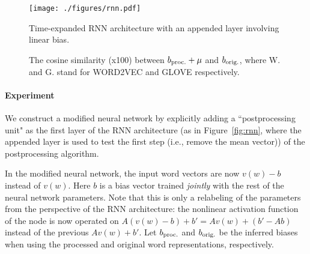 \documentclass{article} \usepackage{acl2017,times}
\begin{document}
{\begin{figure}[htbp]
\begin{minipage}{0.48\textwidth}
\centering
\texttt{[image: ./figures/rnn.pdf]}
\caption{Time-expanded RNN architecture with an appended layer involving linear bias. \label{fig:rnn}}
\end{minipage}
\begin{minipage}{0.48\textwidth}
\centering
{}
\caption{The cosine similarity (x100) between $b_{\rm proc.} + \mu$ and  $b_{\rm orig.}$, where W. and G. stand for WORD2VEC and GLOVE respectively.}
\label{tb:biases}
\end{minipage}
\end{figure}


\paragraph{Experiment} We construct a modified neural network by explicitly adding a ``postprocessing unit" as the first layer of the RNN architecture (as in Figure~\ref{fig:rnn}, where the appended layer is used to test the first step (i.e., remove  the mean vector)) of the  postprocessing algorithm. 

In the modified neural network, the input word vectors are now $v(w) - b$ instead of $v(w)$. Here  $b$ is a bias vector trained {\em jointly} with the rest of the neural network parameters. Note that this is only a relabeling of the parameters from the perspective of the RNN architecture:   the nonlinear activation function of the node is now operated on $A(v(w)-b) + b' = Av(w) + (b'-Ab)$ instead of the previous $Av(w) + b'$. Let $b_{\rm proc.}$ and $b_{\rm orig.}$ be the inferred biases when using  the processed and original word representations, respectively. 

}
\end{document}
